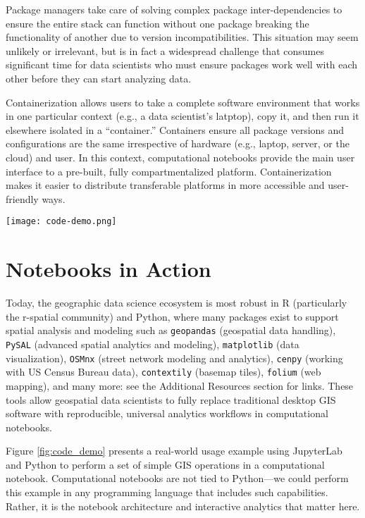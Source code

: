 \documentclass[11pt,letterpaper]{article}
\begin{document}
Package managers take care of solving complex package inter-dependencies to ensure the entire stack can function without one package breaking the functionality of another due to version incompatibilities. This situation may seem unlikely or irrelevant, but is in fact a widespread challenge that consumes significant time for data scientists who must ensure packages work well with each other before they can start analyzing data.

Containerization allows users to take a complete software environment that works in one particular context (e.g., a data scientist's latptop), copy it, and then run it elsewhere isolated in a \enquote{container.} Containers ensure all package versions and configurations are the same irrespective of hardware (e.g., laptop, server, or the cloud) and user. In this context, computational notebooks provide the main user interface to a pre-built, fully compartmentalized platform. Containerization makes it easier to distribute transferable platforms in more accessible and user-friendly ways.

\begin{figure*}[!bt]
	\centering
	\texttt{[image: code-demo.png]}
	\caption{Simple real-world usage example that demonstrates basic GIS in a computational notebook, using JupyterLab and Python.}
	\label{fig:code_demo}
\end{figure*}

\section{Notebooks in Action}

Today, the geographic data science ecosystem is most robust in R (particularly the r-spatial community) and Python, where many packages exist to support spatial analysis and modeling such as \texttt{geopandas} (geospatial data handling), \texttt{PySAL} (advanced spatial analytics and modeling), \texttt{matplotlib} (data visualization), \texttt{OSMnx}  (street network modeling and analytics), \texttt{cenpy} (working with US Census Bureau data), \texttt{contextily} (basemap tiles), \texttt{folium} (web mapping), and many more: see the Additional Resources section for links. These tools allow geospatial data scientists to fully replace traditional desktop GIS software with reproducible, universal analytics workflows in computational notebooks.

Figure \ref{fig:code_demo} presents a real-world usage example using JupyterLab and Python to perform a set of simple GIS operations in a computational notebook. Computational notebooks are not tied to Python---we could perform this example in any programming language that includes such capabilities. Rather, it is the notebook architecture and interactive analytics that matter here.
\end{document}
